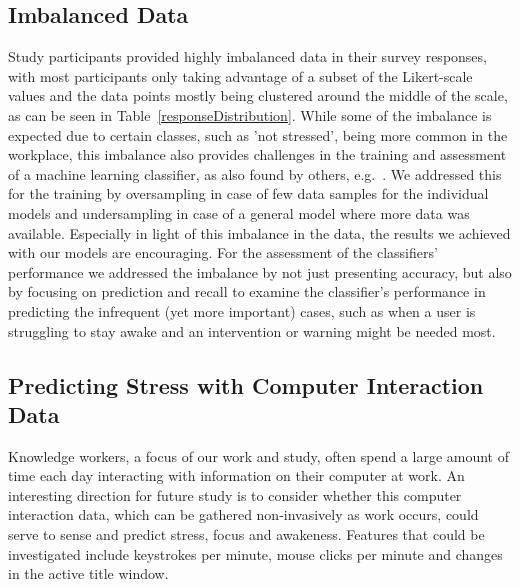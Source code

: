 \subsection{Imbalanced Data}
Study participants provided highly
imbalanced data in their survey responses, with most participants only
taking advantage of a subset of the Likert-scale values and the data
points mostly being clustered around the middle of the scale, as can
be seen in Table~\ref{responseDistribution}. While some of the
imbalance is expected due to certain classes, such as 'not stressed',
being more common in the workplace, this imbalance also provides
challenges in the training and assessment of a machine learning
classifier, as also found by others, e.g.~\cite{Exler16}. We addressed
this for the training by oversampling in case of few data samples for
the individual models and undersampling in case of a general model
where more data was available. Especially in light of this imbalance
in the data, the results we achieved with our models are
encouraging. For the assessment of the classifiers' performance we
addressed the imbalance by not just presenting accuracy, but also by
focusing on prediction and recall to examine the classifier's
performance in predicting the infrequent (yet more important) cases,
such as when a user is struggling to stay awake and an intervention or
warning might be needed most.

\subsection{Predicting Stress with Computer Interaction Data}
Knowledge workers, a focus of our work and study, often spend
a large amount of time each day interacting with information on 
their computer at work. An interesting direction for future study
is to consider whether this computer interaction data, which can
be gathered non-invasively as work occurs, could serve to sense
and predict stress, focus and awakeness. Features that could be
investigated include keystrokes per minute, mouse clicks per minute
and changes in the active title window.



